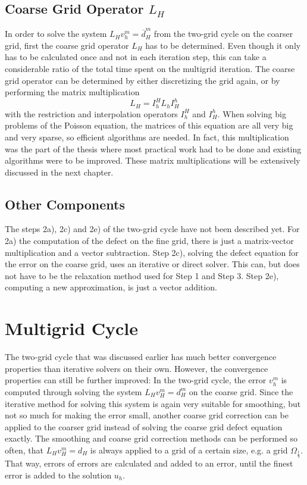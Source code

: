 \subsection{Coarse Grid Operator $L_H$}
\label{sec:PtAP}
In order to solve the system $L_H v_h^m = \overline{d}_H^m$ from the two-grid cycle on the coarser grid, first the coarse grid operator $L_H$ has to be determined. Even though it only has to be calculated once and not in each iteration step, this can take a considerable ratio of the total time spent on the multigrid iteration. The coarse grid operator can be determined by either discretizing the grid again, or by performing the matrix multiplication
\begin{equation}
L_H = I_h^H L_h I_H^h
\label{equ:galerkin}
\end{equation}
with the restriction and interpolation operators $I_h^H$ and $I_H^h$. When solving big problems of the Poisson equation, the matrices of this equation are all very big and very sparse, so efficient algorithms are needed. In fact, this multiplication was the part of the thesis where most practical work had to be done and existing algorithms were to be improved. These matrix multiplications will be extensively discussed in the next chapter. 

\subsection{Other Components}
The steps 2a), 2c) and 2e) of the two-grid cycle have not been described yet. For 2a) the computation of the defect on the fine grid, there is just a matrix-vector multiplication and a  vector subtraction. Step 2c), solving the defect equation for the error on the coarse grid, uses an iterative or direct solver. This  can, but does not have to be the relaxation method used for Step 1 and Step 3. Step 2e), computing a new approximation, is just a vector addition. 

\section{Multigrid Cycle}
\label{sec:multigrid_cycle}
The two-grid cycle that was discussed earlier has much better convergence properties than iterative solvers on their own. However, the convergence properties can still be further improved: In the two-grid cycle, the error $v_h^m$ is computed through solving the system $L_H v_H^m = d_H^m$ on the coarse grid. Since the iterative method for solving this system is again very suitable for smoothing, but not so much for making the error small, another coarse grid correction can be applied to the coarser grid instead of solving the coarse grid defect equation exactly.  The smoothing and coarse grid correction methods can be performed so often, that $L_H v_H^m = d_H$ is always applied to a grid of a certain size, e.g. a grid $\Omega_{\frac{1}{4}}$. That way, errors of errors are calculated and added to an error, until the finest error is added to the solution $u_h$. 

